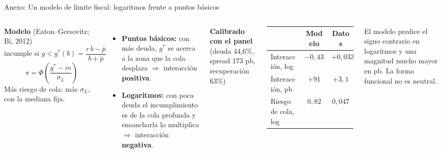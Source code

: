 \documentclass[aspectratio=169]{beamer}
\begin{document}
\begin{frame}{Anexo: Un modelo de límite fiscal: logaritmos frente a puntos básicos}
\small
\begin{columns}[T]
\textbf{Modelo} (Eaton--Gersovitz; Bi, 2012)
\[ \text{incumple si } g<g^*(b)=\frac{r\,b-\bar p}{b+\bar p} \]
\[ \pi=\Phi\!\left(\frac{g^*-m}{\sigma_L}\right) \]
Más riesgo de cola: más $\sigma_L$, con la mediana fija.
\begin{itemize}\footnotesize
\item \textbf{Puntos básicos:} con más deuda, $g^*$ se acerca a la zona que la cola desplaza $\Rightarrow$ interacción \textbf{positiva}.
\item \textbf{Logaritmos:} con poca deuda el incumplimiento es de la cola profunda y ensancharla lo multiplica $\Rightarrow$ interacción \textbf{negativa}.
\end{itemize}
\footnotesize
\textbf{Calibrado con el panel} (deuda 44,6\%, spread 173 pb, recuperación 63\%)
\vspace{2pt}

\begin{tabular}{lcc}
\toprule
 & Modelo & Datos \\
\midrule
Interacción, log & $-0{,}43$ & $+0{,}033$ \\
Interacción, pb & $+91$ & $+3{,}1$ \\
Riesgo de cola, log & $0{,}82$ & $0{,}047$ \\
\bottomrule
\end{tabular}
\vspace{4pt}

El modelo predice el signo contrario en logaritmos y una magnitud mucho mayor en pb. La forma funcional no es neutral.
\end{columns}
\end{frame}
\end{document}
